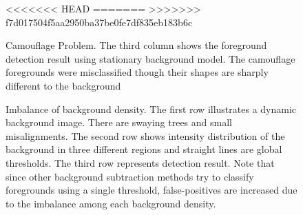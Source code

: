 \documentclass[a4paper,twocolumn, 10pt]{article}
\begin{document}
\begin{figure}[t]
  \centering
  \label{fig10}
<<<<<<< HEAD
  \hfill
  \hfill
=======
  \hfill
  \hfill
>>>>>>> f7d017504f5aa2950ba37be0fe7df835eb183b6c
  \caption{Camouflage Problem. The third column shows the foreground detection result using stationary background model. The camouflage foregrounds were misclassified though their shapes are sharply different to the background}
\end{figure}

\begin{figure}[t]
  \centering
  \label{fig20}
  \hfill
  \caption{Imbalance of background density. The first row illustrates a dynamic background image. There are swaying trees and small misalignments. The second row shows intensity distribution of the background in three different regions and straight lines are global thresholds. The third row represents detection result. Note that since other background subtraction methods try to classify foregrounds using a single threshold, false-positives are increased due to the imbalance among each background density.}
\end{figure}
\end{document}
